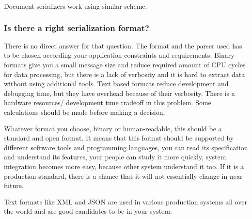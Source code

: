 Document serializers work using similar scheme.

\subsubsection{Is there a right serialization format?}

There is no direct answer for that question.
The format and the parser used has to be chosen according your application
constraints and requirements. Binary formats give you a small message size and
reduce required amount of CPU cycles for data processing, but there is a lack of
verbosity and it is hard to extract data without using additional tools. Text
based formats reduce development and debugging time, but they have overhead
because of their verbosity. There is a hardware resources/ development
time tradeoff in this problem. Some calculations should be made before making a
decision.

Whatever format you choose, binary or human-readable, this should be  a
standard and open format.
It means that this format should be supported by different software tools and programming
languages,  you can read its specification and understand its features, your
people can study it more quickly, system integration becomes more easy, because
other system understand it too. If it is a production standard, there is a
chance that it will not essentially change in near future.

Text formats like XML and JSON are used in various production systems all over the world and are good
candidates to be in your system.




